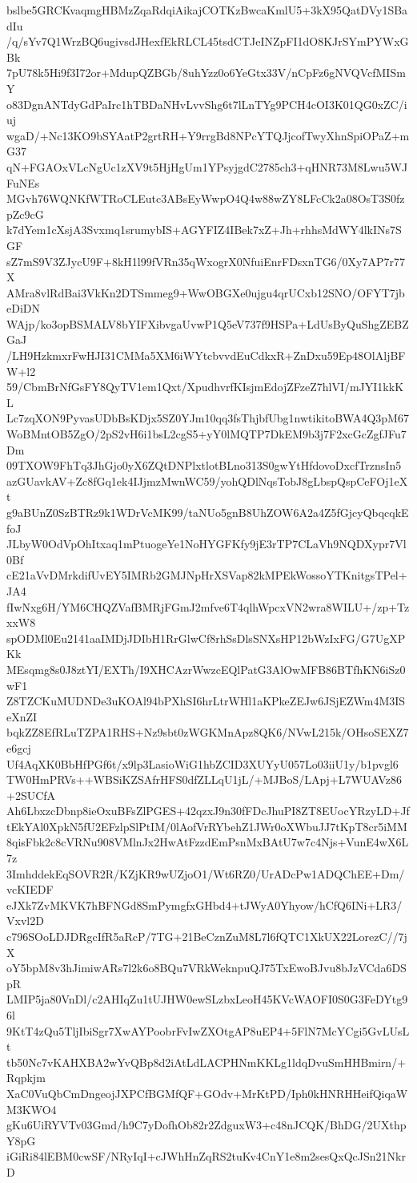 bslbe5GRCKvaqmgHBMzZqaRdqiAikajCOTKzBwcaKmlU5+3kX95QatDVy1SBadIu
/q/sYv7Q1WrzBQ6ugivsdJHexfEkRLCL45tsdCTJeINZpFI1dO8KJrSYmPYWxGBk
7pU78k5Hi9f3I72or+MdupQZBGb/8uhYzz0o6YeGtx33V/nCpFz6gNVQVcfMISmY
o83DgnANTdyGdPaIrc1hTBDaNHvLvvShg6t7lLnTYg9PCH4cOI3K01QG0xZC/iuj
wgaD/+Nc13KO9bSYAatP2grtRH+Y9rrgBd8NPcYTQJjcofTwyXhnSpiOPaZ+mG37
qN+FGAOxVLcNgUc1zXV9t5HjHgUm1YPsyjgdC2785ch3+qHNR73M8Lwu5WJFuNEs
MGvh76WQNKfWTRoCLEutc3ABsEyWwpO4Q4w88wZY8LFcCk2a08OsT3S0fzpZc9cG
k7dYem1cXsjA3Svxmq1srumybIS+AGYFIZ4IBek7xZ+Jh+rhhsMdWY4lkINs7SGF
sZ7mS9V3ZJycU9F+8kH1l99fVRn35qWxogrX0NfuiEnrFDsxnTG6/0Xy7AP7r77X
AMra8vlRdBai3VkKn2DTSmmeg9+WwOBGXe0ujgu4qrUCxb12SNO/OFYT7jbeDiDN
WAjp/ko3opBSMALV8bYIFXibvgaUvwP1Q5eV737f9HSPa+LdUsByQuShgZEBZGaJ
/LH9HzkmxrFwHJI31CMMa5XM6iWYtcbvvdEuCdkxR+ZnDxu59Ep48OlAljBFW+l2
59/CbmBrNfGsFY8QyTV1em1Qxt/XpudhvrfKIsjmEdojZFzeZ7hlVI/mJYI1kkKL
Lc7zqXON9PyvasUDbBsKDjx5SZ0YJm10qq3fsThjbfUbg1nwtikitoBWA4Q3pM67
WoBMntOB5ZgO/2pS2vH6i1bsL2cgS5+yY0lMQTP7DkEM9b3j7F2xcGcZgfJFu7Dm
09TXOW9FhTq3JhGjo0yX6ZQtDNPlxtlotBLno313S0gwYtHfdovoDxcfTrznsIn5
azGUavkAV+Zc8fGq1ek4IJjmzMwnWC59/yohQDlNqsTobJ8gLbspQspCeFOj1eXt
g9aBUnZ0SzBTRz9k1WDrVcMK99/taNUo5gnB8UhZOW6A2a4Z5fGjcyQbqcqkEfoJ
JLbyW0OdVpOhItxaq1mPtuogeYe1NoHYGFKfy9jE3rTP7CLaVh9NQDXypr7Vl0Bf
cE21aVvDMrkdifUvEY5IMRb2GMJNpHrXSVap82kMPEkWossoYTKnitgsTPel+JA4
fIwNxg6H/YM6CHQZVafBMRjFGmJ2mfve6T4qlhWpcxVN2wra8WILU+/zp+TzxxW8
spODMl0Eu2141aaIMDjJDIbH1RrGlwCf8rhSsDlsSNXsHP12bWzIxFG/G7UgXPKk
MEsqmg8s0J8ztYI/EXTh/I9XHCAzrWwzcEQlPatG3AlOwMFB86BTfhKN6iSz0wF1
Z8TZCKuMUDNDe3uKOAl94bPXhSI6hrLtrWHl1aKPkeZEJw6JSjEZWm4M3ISeXnZI
bqkZZ8EfRLuTZPA1RHS+Nz9sbt0zWGKMnApz8QK6/NVwL215k/OHsoSEXZ7e6gcj
Uf4AqXK0BbHfPGf6t/x9lp3LasioWiG1hbZCID3XUYyU057Lo03iiU1y/b1pvgl6
TW0HmPRVs++WBSiKZSAfrHFS0dfZLLqU1jL/+MJBoS/LApj+L7WUAVz86+2SUCfA
Ah6LbxzcDbnp8ieOxuBFsZlPGES+42qzxJ9n30fFDcJhuPI8ZT8EUocYRzyLD+Jf
tEkYAl0XpkN5fU2EFzlpSlPtIM/0lAofVrRYbehZ1JWr0oXWbuJJ7tKpT8cr5iMM
8qisFbk2c8cVRNu908VMlnJx2HwAtFzzdEmPsnMxBAtU7w7c4Njs+VunE4wX6L7z
3ImhddekEqSOVR2R/KZjKR9wUZjoO1/Wt6RZ0/UrADcPw1ADQChEE+Dm/vcKIEDF
eJXk7ZvMKVK7hBFNGd8SmPymgfxGHbd4+tJWyA0Yhyow/hCfQ6INi+LR3/Vxvl2D
c796SOoLDJDRgcIfR5aRcP/7TG+21BeCznZuM8L7l6fQTC1XkUX22LorezC//7jX
oY5bpM8v3hJimiwARs7l2k6o8BQu7VRkWeknpuQJ75TxEwoBJvu8bJzVCda6DSpR
LMIP5ja80VnDl/c2AHIqZu1tUJHW0ewSLzbxLeoH45KVcWAOFI0S0G3FeDYtg96l
9KtT4zQu5TljIbiSgr7XwAYPoobrFvIwZXOtgAP8uEP4+5FlN7McYCgi5GvLUsLt
tb50Nc7vKAHXBA2wYvQBp8d2iAtLdLACPHNmKKLg1ldqDvuSmHHBmirn/+Rqpkjm
XaC0VuQbCmDngeojJXPCfBGMfQF+GOdv+MrKtPD/Iph0kHNRHHeifQiqaWM3KWO4
gKu6UiRYVTv03Gmd/h9C7yDofhOb82r2ZdguxW3+c48nJCQK/BhDG/2UXthpY8pG
iGiRi84lEBM0cwSF/NRyIqI+cJWhHnZqRS2tuKv4CnY1e8m2sesQxQcJSn21NkrD
